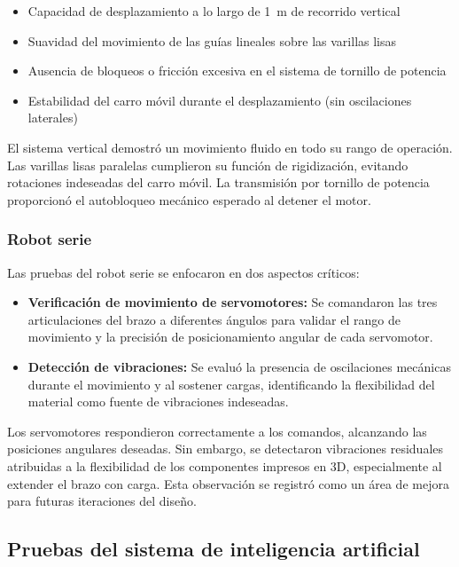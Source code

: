 \begin{itemize}
    \item Capacidad de desplazamiento a lo largo de 1~m de recorrido vertical
    \item Suavidad del movimiento de las guías lineales sobre las varillas lisas
    \item Ausencia de bloqueos o fricción excesiva en el sistema de tornillo de potencia
    \item Estabilidad del carro móvil durante el desplazamiento (sin oscilaciones laterales)
\end{itemize}

El sistema vertical demostró un movimiento fluido en todo su rango de operación. Las varillas lisas paralelas cumplieron su función de rigidización, evitando rotaciones indeseadas del carro móvil. La transmisión por tornillo de potencia proporcionó el autobloqueo mecánico esperado al detener el motor.

\subsubsection{Robot serie}

Las pruebas del robot serie se enfocaron en dos aspectos críticos:

\begin{itemize}
    \item \textbf{Verificación de movimiento de servomotores:} Se comandaron las tres articulaciones del brazo a diferentes ángulos para validar el rango de movimiento y la precisión de posicionamiento angular de cada servomotor.
    \item \textbf{Detección de vibraciones:} Se evaluó la presencia de oscilaciones mecánicas durante el movimiento y al sostener cargas, identificando la flexibilidad del material como fuente de vibraciones indeseadas.
\end{itemize}

Los servomotores respondieron correctamente a los comandos, alcanzando las posiciones angulares deseadas. Sin embargo, se detectaron vibraciones residuales atribuidas a la flexibilidad de los componentes impresos en 3D, especialmente al extender el brazo con carga. Esta observación se registró como un área de mejora para futuras iteraciones del diseño.

\subsection{Pruebas del sistema de inteligencia artificial}

